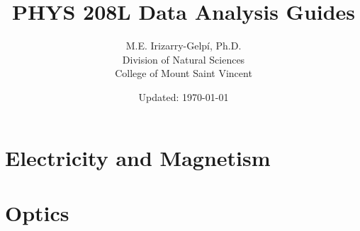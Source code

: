 \documentclass[letterpaper]{report}
\begin{document}
%
\title{\Huge{PHYS 208L Data Analysis Guides}}
\author{M.E. Irizarry-Gelp\'{i}, Ph.D.\\Division of Natural Sciences\\College of Mount Saint Vincent}
\date{Updated: \today}
%
\maketitle
\tableofcontents
%
\part{Electricity and Magnetism}
%





% 
% 

%
\part{Optics}
%





%
\end{document}

